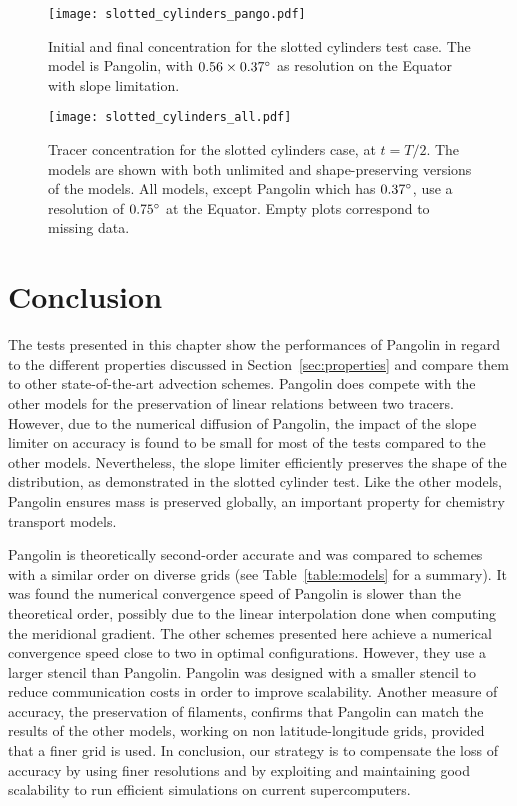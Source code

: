\begin{figure}
  \centerline{%
    \texttt{[image: slotted\_cylinders\_pango.pdf]}%
  }
 \caption{Initial and final concentration for the slotted cylinders test
  case. The model is Pangolin, with $0.56\times0.37^{\circ}$ as resolution on the
  Equator with slope limitation.}
\label{fig:slotted}
\end{figure}

\begin{figure}
  \centering
  \texttt{[image: slotted\_cylinders\_all.pdf]}
  \caption{Tracer concentration for the slotted cylinders case, at $t=T/2$. The
    models are shown with both unlimited and shape-preserving versions of the
    models. All models, except Pangolin which has $0.37^{\circ}$, use a resolution
  of $0.75^{\circ}$ at the Equator. Empty plots correspond to missing data.}
\label{fig:slotted_comp}
\end{figure}

\section{Conclusion}
The tests presented in this chapter show the performances of Pangolin in regard
to the different properties discussed in Section~\ref{sec:properties} and
compare them to other state-of-the-art advection schemes. Pangolin does compete
with the other models for the preservation of linear relations between two
tracers. However, due to the numerical diffusion of Pangolin, the impact of the slope
limiter on accuracy is found to be small for most of the tests compared to the other
models. Nevertheless, the slope limiter efficiently preserves the shape of the
distribution, as demonstrated in the slotted cylinder test. Like the other
models, Pangolin ensures mass is preserved globally, an important property for
chemistry transport models. 

Pangolin is theoretically second-order accurate and was compared to
schemes with a similar order on diverse grids (see Table~\ref{table:models} for
a summary). It was found the numerical convergence speed of Pangolin is slower than the
theoretical order, possibly due to the linear interpolation done when computing
the meridional gradient. The other schemes presented here achieve a numerical
convergence speed close to two in optimal configurations. However, they use a
larger stencil than Pangolin. Pangolin was designed with a smaller stencil to
reduce communication costs in order to improve scalability. Another measure of
accuracy, the preservation of filaments, confirms that Pangolin can match the
results of the other models, working on non latitude-longitude grids, provided
that a finer grid is used. In conclusion, our strategy is to compensate the loss
of accuracy by using finer resolutions and by exploiting and maintaining good
scalability to run efficient simulations on current supercomputers.

